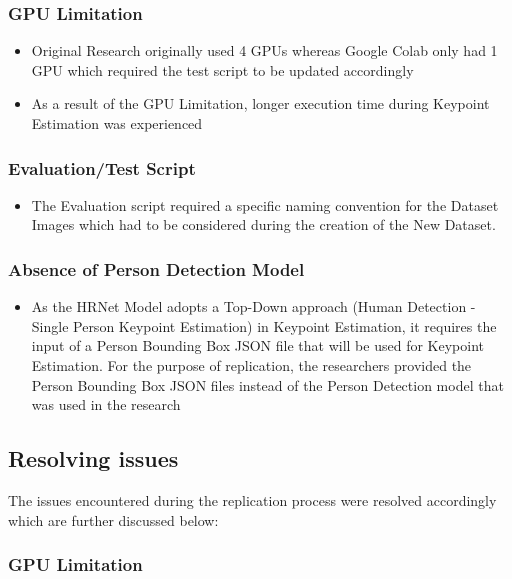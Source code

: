 \documentclass[a4paper,12pt]{article}
\begin{document}
\subsubsection*{GPU Limitation}

\begin{itemize}
    \item Original Research originally used 4 GPUs whereas Google Colab only had 1 GPU which required the test script to be updated accordingly
    \item As a result of the GPU Limitation, longer execution time during Keypoint Estimation was experienced
\end{itemize}

\subsubsection*{Evaluation/Test Script}

\begin{itemize}
    \item The Evaluation script required a specific naming convention for the Dataset Images which had to be considered during the creation of the New Dataset.
\end{itemize}

\subsubsection*{Absence of Person Detection Model}

\begin{itemize}
    \item As the HRNet Model adopts a Top-Down approach (Human Detection - Single Person Keypoint Estimation) in Keypoint Estimation, it requires the input of a Person Bounding Box JSON file that will be used for Keypoint Estimation. For the purpose of replication, the researchers provided the Person Bounding Box JSON files instead of the Person Detection model that was used in the research
\end{itemize}

\subsection{Resolving issues}

The issues encountered during the replication process were resolved accordingly which are further discussed below:\par

\subsubsection*{GPU Limitation}
\end{document}
